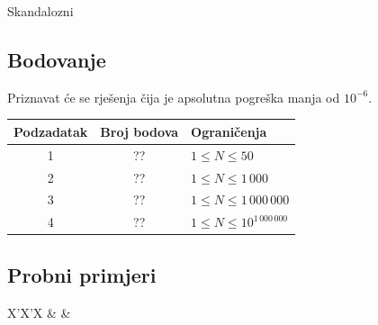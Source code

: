 \begin{statement}[
  problempoints=100,
  timelimit=1 sekunda,
  memorylimit=512 MiB,
]{Skandalozni}
\subsection*{Bodovanje}
Priznavat će se rješenja čija je apsolutna pogreška manja od $10^{-6}$.

{\renewcommand{\arraystretch}{1.4}
  \setlength{\tabcolsep}{6pt}
  \begin{tabular}{ccl}
 Podzadatak & Broj bodova & Ograničenja \\ \midrule
  1 & ?? & $1 \le N \le 50$ \\
  2 & ?? & $1 \le N \le 1\,000$ \\
  3 & ?? & $1 \le N \le 1\,000\,000$ \\
  4 & ?? & $1 \le N \le 10^{1\,000\,000}$ \\
\end{tabular}}

\subsection*{Probni primjeri}
\begin{tabularx}{\textwidth}{X'X'X}
 &
 &
\end{tabularx}

\end{statement}

